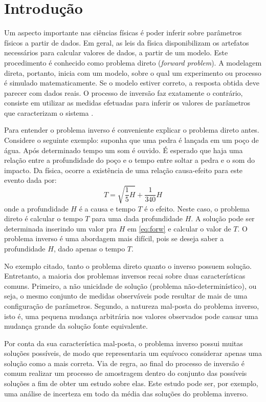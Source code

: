 \chapter{Introdução}
\label{cap:1intro}

Um aspecto importante nas ciências físicas é poder inferir sobre parâmetros
físicos a partir de dados. Em geral, as leis da física disponibilizam os
artefatos necessários para calcular valores de dados, a partir de um modelo.
Este procedimento é conhecido como problema direto (\textit{forward problem}).
A modelagem direta, portanto, inicia com um modelo, sobre o qual um experimento ou processo
é simulado matematicamente. Se o modelo estiver correto, a resposta
obtida deve parecer com dados reais. O processo de inversão faz exatamente o contrário,
consiste em utilizar as medidas efetuadas para inferir os valores de parâmetros que
caracterizam o sistema \citep{tarantola}.

Para entender o problema inverso é conveniente explicar o problema direto antes.
Considere o seguinte exemplo: suponha que uma pedra é lançada em um poço de água.
Após determinado tempo um som é ouvido. É esperado que haja uma relação entre a
profundidade do poço e o tempo entre soltar a pedra e o som do impacto. Da física,
ocorre a existência de uma relação causa-efeito para este evento dada por:
\begin{equation}
\label{eq:forw}
T = \sqrt{\frac{1}{5}H} + \frac{1}{340}H
\end{equation}
onde a profundidade $H$ é a causa e tempo $T$ é o efeito.
Neste caso, o problema direto é calcular o tempo $T$ para uma dada profundidade $H$.
A solução pode ser determinada inserindo um valor pra $H$ em \ref{eq:forw} e calcular o
valor de $T$. O problema inverso é uma abordagem mais difícil, pois se deseja
saber a profundidade $H$, dado apenas o tempo $T$.

No exemplo citado, tanto o problema direto quanto o inverso possuem solução. Entretanto,
a maioria dos problemas inversos recai sobre duas características
comuns. Primeiro, a não unicidade de solução (problema não-determinístico), ou seja, o mesmo conjunto de medidas
observáveis pode resultar de mais de uma configuração de parâmetros. Segundo,
a natureza mal-posta do problema inverso, isto é, uma pequena mudança arbitrária nos
valores observados pode causar uma mudança grande da solução fonte equivalente.

Por conta da sua característica mal-posta, o problema inverso
possui muitas soluções possíveis, de modo que representaria um equívoco considerar apenas
uma solução como a mais correta. Via de regra, ao final do processo de inversão é comum
realizar um processo de amostragem dentro do conjunto das possíveis soluções a fim
de obter um estudo sobre elas. Este estudo pode ser, por exemplo, uma análise de 
incerteza em todo da média das soluções do problema inverso.

